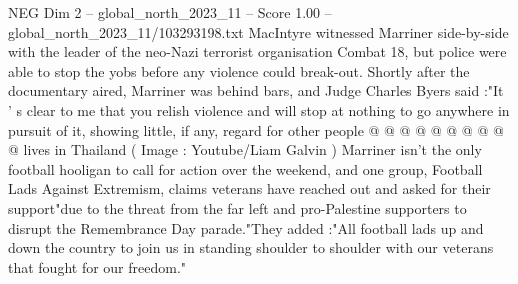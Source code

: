 \begin{textsample}{NEG Dim 2 – global\_north\_2023\_11 – Score 1.00 – global\_north\_2023\_11/103293198.txt}
MacIntyre witnessed Marriner side-by-side with the leader of the neo-Nazi terrorist organisation Combat 18, but police were able to stop the yobs before any violence could break-out.
Shortly after the documentary aired, Marriner was behind bars, and Judge Charles Byers said :"It ' s clear to me that you relish violence and will stop at nothing to go anywhere in pursuit of it, showing little, if any, regard for other people @ @ @ @ @ @ @ @ @ @ lives in Thailand ( Image : Youtube/Liam Galvin ) Marriner isn't the only football hooligan to call for action over the weekend, and one group, Football Lads Against Extremism, claims veterans have reached out and asked for their support"due to the threat from the far left and pro-Palestine supporters to disrupt the Remembrance Day parade."They added :"All football lads up and down the country to join us in standing shoulder to shoulder with our veterans that fought for our freedom."

\end{textsample}
